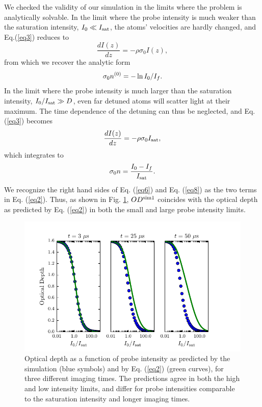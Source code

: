 \documentclass[12pt]{iopart}
\begin{document}
\par We checked the validity of our simulation in the limits where the problem is analytically solvable. In the limit where the probe intensity is much weaker than the saturation intensity, $I_0\ll I_{\rm{sat}}$, the atoms' velocities are hardly changed, and Eq.(\ref{eq3}) reduces to 
\begin{equation}
\frac{dI(z)}{dz}=-\rho\sigma_0 I(z),
\end{equation}
from which we recover the analytic form 
\begin{equation}
\sigma_0 n^{\rm{(0)}} = -\ln I_0/I_f. \label{eq6}
\end{equation}
In the limit where the probe intensity is much larger than the saturation intensity, $I_0/I_{\rm{sat}}\gg D$, even far detuned atoms will scatter light at their maximum. The time dependence of the detuning can thus be neglected, and Eq. (\ref{eq3}) becomes 
\begin{equation}
\frac{dI(z)}{dz}=-\rho\sigma_0 I_{\rm{sat}}, 
\end{equation}
which integrates to 
\begin{equation}
\sigma_0 n = \frac{I_0 - I_f}{I_{\rm{sat}}}. \label{eq8}
\end{equation}
We recognize the right hand sides of Eq. (\ref{eq6}) and Eq. (\ref{eq8}) as the two terms in Eq. (\ref{eq2}). Thus, as shown in  Fig. \ref{fig:IsatLimits}, $OD^{\rm{sim1}}$  coincides with the optical depth as predicted by Eq. (\ref{eq2}) in both the small and large probe intensity limits. 
\begin{figure}
	\includegraphics{figure3.pdf}
\caption{Optical depth as a function of probe intensity as predicted by the simulation (blue symbols) and by Eq. (\ref{eq2}) (green curves), for three different imaging times. The predictions agree in both the high and low intensity limits, and differ for probe intensities comparable to the saturation intensity and longer imaging times. }  
\label{fig:IsatLimits}
\end{figure}
\end{document}
